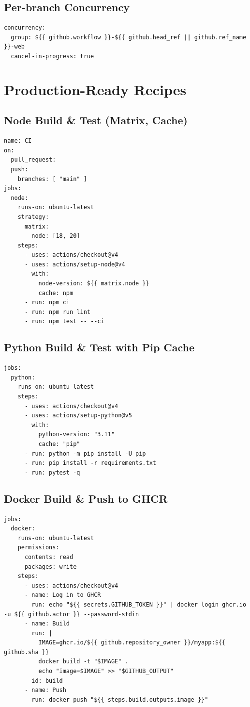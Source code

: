 \documentclass[11pt]{article}
\begin{document}
\subsection{Per-branch Concurrency}
\begin{verbatim}
concurrency:
  group: ${{ github.workflow }}-${{ github.head_ref || github.ref_name }}-web
  cancel-in-progress: true
\end{verbatim}

\section{Production-Ready Recipes}
\subsection{Node Build \& Test (Matrix, Cache)}
\begin{verbatim}
name: CI
on:
  pull_request:
  push:
    branches: [ "main" ]
jobs:
  node:
    runs-on: ubuntu-latest
    strategy:
      matrix:
        node: [18, 20]
    steps:
      - uses: actions/checkout@v4
      - uses: actions/setup-node@v4
        with:
          node-version: ${{ matrix.node }}
          cache: npm
      - run: npm ci
      - run: npm run lint
      - run: npm test -- --ci
\end{verbatim}

\subsection{Python Build \& Test with Pip Cache}
\begin{verbatim}
jobs:
  python:
    runs-on: ubuntu-latest
    steps:
      - uses: actions/checkout@v4
      - uses: actions/setup-python@v5
        with:
          python-version: "3.11"
          cache: "pip"
      - run: python -m pip install -U pip
      - run: pip install -r requirements.txt
      - run: pytest -q
\end{verbatim}
\clearpage

\subsection{Docker Build \& Push to GHCR}
\begin{verbatim}
jobs:
  docker:
    runs-on: ubuntu-latest
    permissions:
      contents: read
      packages: write
    steps:
      - uses: actions/checkout@v4
      - name: Log in to GHCR
        run: echo "${{ secrets.GITHUB_TOKEN }}" | docker login ghcr.io -u ${{ github.actor }} --password-stdin
      - name: Build
        run: |
          IMAGE=ghcr.io/${{ github.repository_owner }}/myapp:${{ github.sha }}
          docker build -t "$IMAGE" .
          echo "image=$IMAGE" >> "$GITHUB_OUTPUT"
        id: build
      - name: Push
        run: docker push "${{ steps.build.outputs.image }}"
\end{verbatim}
\end{document}
